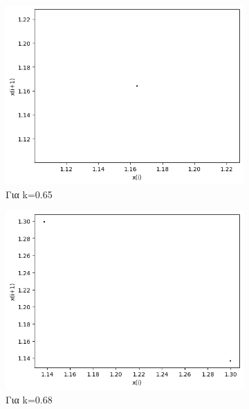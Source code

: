 \begin{figure}[h!]
\begin{subfigure}[b]{0.4\textwidth}
		\includegraphics[width=\textwidth]{LateX images/graphs q14/g13}
		\caption{Για k=0.65}
		\label{f:k70}
	\end{subfigure}
	\hfill
	\begin{subfigure}[b]{0.4\textwidth}
		\centering
		\includegraphics[width=\textwidth]{LateX images/graphs q14/g14}
		\caption{Για k=0.68}
		\label{f:k71}
	\end{subfigure}
	\hfill
	\begin{subfigure}[b]{0.4\textwidth}
		\centering

\end{subfigure}
\end{figure}
